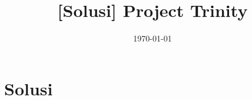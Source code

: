 

\title{[Solusi] Project Trinity}
\date{\today}



\maketitle

\renewcommand*\contentsname{Daftar Isi}
\tableofcontents

\newpage
\section{Solusi}


